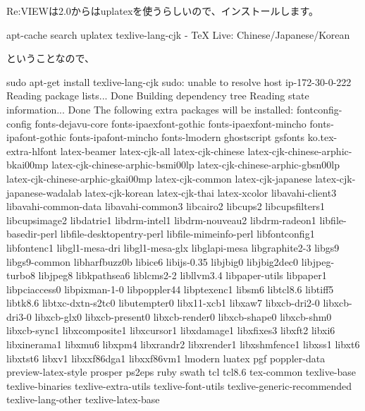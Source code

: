 Re:VIEWは2.0からはuplatexを使うらしいので、インストールします。

\begin{reviewemlist}
\textdollar{} apt{-}cache search uplatex
texlive{-}lang{-}cjk {-} TeX Live: Chinese/Japanese/Korean
\end{reviewemlist}

ということなので、

\begin{reviewemlist}
\textdollar{} sudo apt{-}get install texlive{-}lang{-}cjk
sudo: unable to resolve host ip{-}172{-}30{-}0{-}222
Reading package lists... Done
Building dependency tree
Reading state information... Done
The following extra packages will be installed:
  fontconfig{-}config fonts{-}dejavu{-}core fonts{-}ipaexfont{-}gothic
  fonts{-}ipaexfont{-}mincho fonts{-}ipafont{-}gothic fonts{-}ipafont{-}mincho
  fonts{-}lmodern ghostscript gsfonts ko.tex{-}extra{-}hlfont latex{-}beamer
  latex{-}cjk{-}all latex{-}cjk{-}chinese latex{-}cjk{-}chinese{-}arphic{-}bkai00mp
  latex{-}cjk{-}chinese{-}arphic{-}bsmi00lp latex{-}cjk{-}chinese{-}arphic{-}gbsn00lp
  latex{-}cjk{-}chinese{-}arphic{-}gkai00mp latex{-}cjk{-}common latex{-}cjk{-}japanese
  latex{-}cjk{-}japanese{-}wadalab latex{-}cjk{-}korean latex{-}cjk{-}thai latex{-}xcolor
  libavahi{-}client3 libavahi{-}common{-}data libavahi{-}common3 libcairo2 libcups2
  libcupsfilters1 libcupsimage2 libdatrie1 libdrm{-}intel1 libdrm{-}nouveau2
  libdrm{-}radeon1 libfile{-}basedir{-}perl libfile{-}desktopentry{-}perl
  libfile{-}mimeinfo{-}perl libfontconfig1 libfontenc1 libgl1{-}mesa{-}dri
  libgl1{-}mesa{-}glx libglapi{-}mesa libgraphite2{-}3 libgs9 libgs9{-}common
  libharfbuzz0b libice6 libijs{-}0.35 libjbig0 libjbig2dec0 libjpeg{-}turbo8
  libjpeg8 libkpathsea6 liblcms2{-}2 libllvm3.4 libpaper{-}utils libpaper1
  libpciaccess0 libpixman{-}1{-}0 libpoppler44 libptexenc1 libsm6 libtcl8.6
  libtiff5 libtk8.6 libtxc{-}dxtn{-}s2tc0 libutempter0 libx11{-}xcb1 libxaw7
  libxcb{-}dri2{-}0 libxcb{-}dri3{-}0 libxcb{-}glx0 libxcb{-}present0 libxcb{-}render0
  libxcb{-}shape0 libxcb{-}shm0 libxcb{-}sync1 libxcomposite1 libxcursor1
  libxdamage1 libxfixes3 libxft2 libxi6 libxinerama1 libxmu6 libxpm4
  libxrandr2 libxrender1 libxshmfence1 libxss1 libxt6 libxtst6 libxv1
  libxxf86dga1 libxxf86vm1 lmodern luatex pgf poppler{-}data preview{-}latex{-}style
  prosper ps2eps ruby swath tcl tcl8.6 tex{-}common texlive{-}base
  texlive{-}binaries texlive{-}extra{-}utils texlive{-}font{-}utils
  texlive{-}generic{-}recommended texlive{-}lang{-}other texlive{-}latex{-}base

\end{reviewemlist}
